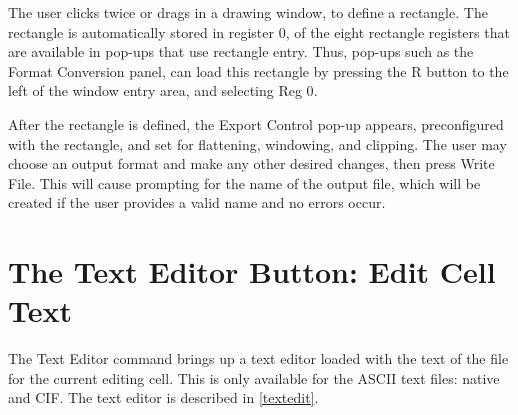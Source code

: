 The user clicks twice or drags in a drawing window, to define a
rectangle.  The rectangle is automatically stored in register 0, of
the eight rectangle registers that are available in pop-ups that use
rectangle entry.  Thus, pop-ups such as the {\cb Format Conversion}
panel, can load this rectangle by pressing the {\cb R} button to the
left of the window entry area, and selecting {\cb Reg 0}.

After the rectangle is defined, the {\cb Export Control} pop-up
appears, preconfigured with the rectangle, and set for flattening,
windowing, and clipping.  The user may choose an output format and
make any other desired changes, then press {\cb Write File}.  This
will cause prompting for the name of the output file, which will be
created if the user provides a valid name and no errors occur.


\section{The {\cb Text Editor} Button: Edit Cell Text}

The {\cb Text Editor} command brings up a text editor loaded with the
text of the file for the current editing cell.  This is only available
for the ASCII text files:  native and CIF.  The text editor is
described in \ref{textedit}.

